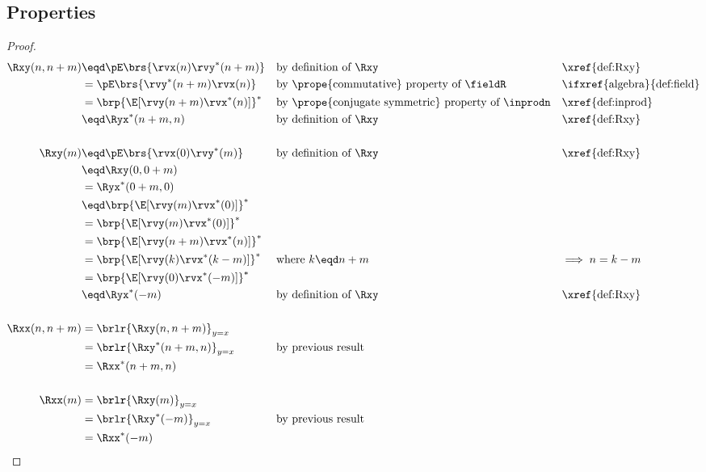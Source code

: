 \subsection{Properties}
\begin{theorem}
\end{theorem}
\begin{proof}
\begin{align*}
  \Rxy(n,n+m)
     &\eqd \pE\brs{\rvx(n) \rvy^\ast(n+m)}
     && \text{by definition of $\Rxy$}
     && \text{\xref{def:Rxy}}
   \\&=    \pE\brs{\rvy^\ast(n+m) \rvx(n)}
     && \text{by \prope{commutative} property of $\fieldR$}
     && \text{\ifxref{algebra}{def:field}}
   \\&=    \brp{\E[\rvy(n+m) \rvx^\ast(n) ]}^\ast
     && \text{by \prope{conjugate symmetric} property of $\inprodn$}
     && \text{\xref{def:inprod}}
   \\&\eqd \Ryx^\ast(n+m,n)
     && \text{by definition of $\Rxy$}
     && \text{\xref{def:Rxy}}
  \\
  \\
  \Rxy(m)
     &\eqd \pE\brs{\rvx(0) \rvy^\ast(m)}
     && \text{by definition of $\Rxy$}
     && \text{\xref{def:Rxy}}
   \\&\eqd \Rxy(0,0+m)
   \\&=    \Ryx^\ast(0+m,0)
   \\&\eqd \brp{\E[\rvy(m) \rvx^\ast(0) ]}^\ast
   \\&=    \brp{\E[\rvy(m) \rvx^\ast(0) ]}^\ast
   \\&=    \brp{\E[\rvy(n+m) \rvx^\ast(n) ]}^\ast
   \\&=    \brp{\E[\rvy(k) \rvx^\ast(k-m) ]}^\ast
     && \text{where $k\eqd n+m$}
     && \text{$\implies n=k-m$}
   \\&=    \brp{\E[\rvy(0) \rvx^\ast(-m) ]}^\ast
   \\&\eqd \Ryx^\ast(-m)
     && \text{by definition of $\Rxy$}
     && \text{\xref{def:Rxy}}
   \\
   \\
   \Rxx(n,n+m)
     &= \brlr{\Rxy(n,n+m)}_{y=x}
   \\&= \brlr{\Rxy^\ast(n+m,n)}_{y=x}
     && \text{by previous result}
   \\&= \Rxx^\ast(n+m,n)
   \\
   \\
   \Rxx(m)
     &= \brlr{\Rxy(m)}_{y=x}
   \\&= \brlr{\Rxy^\ast(-m)}_{y=x}
     && \text{by previous result}
   \\&= \Rxx^\ast(-m)
\end{align*}
\end{proof}

